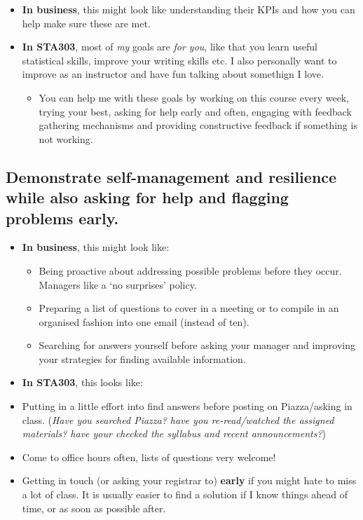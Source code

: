 \documentclass[
  openany]{book}
\providecommand{\tightlist}{%
  \setlength{\itemsep}{0pt}\setlength{\parskip}{0pt}}
\begin{document}
\begin{itemize}
\tightlist
\item
  \textbf{In business}, this might look like understanding their KPIs and how you can help make sure these are met.
\item
  \textbf{In STA303}, most of \emph{my} goals are \emph{for you}, like that you learn useful statistical skills, improve your writing skills etc. I also personally want to improve as an instructor and have fun talking about somethign I love.

  \begin{itemize}
  \tightlist
  \item
    You can help me with these goals by working on this course every week, trying your best, asking for help early and often, engaging with feedback gathering mechanisms and providing constructive feedback if something is not working.
  \end{itemize}
\end{itemize}

\hypertarget{demonstrate-self-management-and-resilience-while-also-asking-for-help-and-flagging-problems-early.}{%
\subsection{Demonstrate self-management and resilience while also asking for help and flagging problems early.}\label{demonstrate-self-management-and-resilience-while-also-asking-for-help-and-flagging-problems-early.}}

\begin{itemize}
\tightlist
\item
  \textbf{In business}, this might look like:

  \begin{itemize}
  \tightlist
  \item
    Being proactive about addressing possible problems before they occur. Managers like a `no surprises' policy.
  \item
    Preparing a list of questions to cover in a meeting or to compile in an organised fashion into one email (instead of ten).
  \item
    Searching for answers yourself before asking your manager and improving your strategies for finding available information.
  \end{itemize}
\item
  \textbf{In STA303}, this looks like:
\item
  Putting in a little effort into find answers before posting on Piazza/asking in class. (\emph{Have you searched Piazza? have you re-read/watched the assigned materials? have your checked the syllabus and recent announcements?})
\item
  Come to office hours often, lists of questions very welcome!
\item
  Getting in touch (or asking your registrar to) \textbf{early} if you might hate to miss a lot of class. It is usually easier to find a solution if I know things ahead of time, or as soon as possible after.
\end{itemize}
\end{document}
